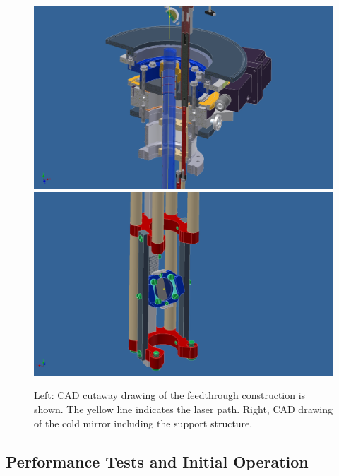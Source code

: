 \begin{figure}[htb]
\centering
     \includegraphics[height=0.6\textwidth]{figures/Feedthrough.pdf} \includegraphics[height=0.6\textwidth]{figures/Mirror.pdf}
     \caption[CAD drawing of the feedthrough and the mirror support structure.]{Left: CAD cutaway drawing of the feedthrough construction is shown. The yellow line indicates the laser path. Right, CAD drawing of the cold mirror including the support structure.}
  \label{fig:feedthrough}
\end{figure}


\subsection{Performance Tests and Initial Operation}

